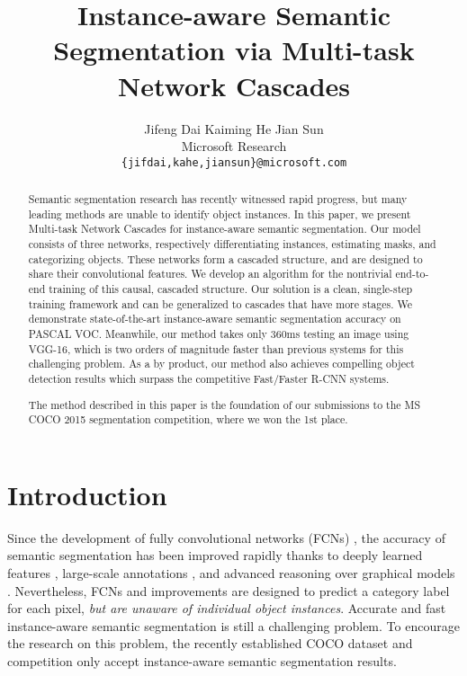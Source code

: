 \documentclass[10pt,twocolumn,letterpaper]{article}
\begin{document}
\title{Instance-aware Semantic Segmentation via Multi-task Network Cascades}

\author{Jifeng Dai \qquad\qquad Kaiming He \qquad\qquad Jian Sun \vspace{8pt}\\
Microsoft Research\\
{\tt\small \{jifdai,kahe,jiansun\}@microsoft.com}
}


\maketitle


\begin{abstract}
\vspace{-1em}
Semantic segmentation research has recently witnessed rapid progress, but many leading methods are unable to identify object instances. In this paper, we present Multi-task Network Cascades for instance-aware semantic segmentation. Our model consists of three networks, respectively differentiating instances, estimating masks, and categorizing objects. These networks form a cascaded structure, and are designed to share their convolutional features. We develop an algorithm for the nontrivial end-to-end training of this causal, cascaded structure. Our solution is a clean, single-step training framework and can be generalized to cascades that have more stages.
We demonstrate state-of-the-art instance-aware semantic segmentation accuracy on PASCAL VOC. Meanwhile, our method takes only 360ms testing an image using VGG-16, which is two orders of magnitude faster than previous systems for this challenging problem. As a by product, our method also achieves compelling object detection results which surpass the competitive Fast/Faster R-CNN systems.

The method described in this paper is the foundation of our submissions to the MS COCO 2015 segmentation competition, where we won the 1st place.
\end{abstract}







\section{Introduction}

Since the development of fully convolutional networks (FCNs) \cite{Long2015}, the accuracy of semantic segmentation has been improved rapidly \cite{Chen2015,Papandreou2015,Dai2015a,Zheng2015} thanks to deeply learned features \cite{Krizhevsky2012,Simonyan2015}, large-scale annotations \cite{Lin2014}, and advanced reasoning over graphical models \cite{Chen2015,Zheng2015}. Nevertheless, FCNs \cite{Long2015} and improvements \cite{Chen2015,Papandreou2015,Dai2015a,Zheng2015} are designed to predict a category label for each pixel, \emph{but are unaware of individual object instances}.
Accurate and fast instance-aware semantic segmentation is still a challenging problem.
To encourage the research on this problem, the recently established COCO \cite{Lin2014} dataset and competition only accept instance-aware semantic segmentation results.
\end{document}
